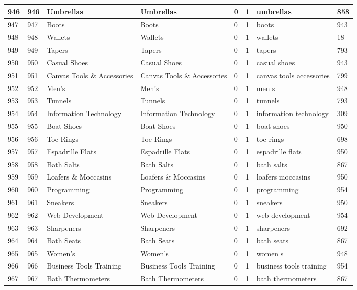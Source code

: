 \begin{longtable}{|l|l|l|l|l|l|l|l|}
946 & 946 & Umbrellas & Umbrellas & 0 & 1 & umbrellas & 858 \\ \hline 
947 & 947 & Boots & Boots & 0 & 1 & boots & 943 \\ \hline 
948 & 948 & Wallets & Wallets & 0 & 1 & wallets & 18 \\ \hline 
949 & 949 & Tapers & Tapers & 0 & 1 & tapers & 793 \\ \hline 
950 & 950 & Casual Shoes & Casual Shoes & 0 & 1 & casual shoes & 943 \\ \hline 
951 & 951 & Canvas Tools \& Accessories & Canvas Tools \& Accessories & 0 & 1 & canvas tools accessories & 799 \\ \hline 
952 & 952 & Men's & Men's & 0 & 1 & men s & 948 \\ \hline 
953 & 953 & Tunnels & Tunnels & 0 & 1 & tunnels & 793 \\ \hline 
954 & 954 & Information Technology & Information Technology & 0 & 1 & information technology & 309 \\ \hline 
955 & 955 & Boat Shoes & Boat Shoes & 0 & 1 & boat shoes & 950 \\ \hline 
956 & 956 & Toe Rings & Toe Rings & 0 & 1 & toe rings & 698 \\ \hline 
957 & 957 & Espadrille Flats & Espadrille Flats & 0 & 1 & espadrille flats & 950 \\ \hline 
958 & 958 & Bath Salts & Bath Salts & 0 & 1 & bath salts & 867 \\ \hline 
959 & 959 & Loafers \& Moccasins & Loafers \& Moccasins & 0 & 1 & loafers moccasins & 950 \\ \hline 
960 & 960 & Programming & Programming & 0 & 1 & programming & 954 \\ \hline 
961 & 961 & Sneakers & Sneakers & 0 & 1 & sneakers & 950 \\ \hline 
962 & 962 & Web Development & Web Development & 0 & 1 & web development & 954 \\ \hline 
963 & 963 & Sharpeners & Sharpeners & 0 & 1 & sharpeners & 692 \\ \hline 
964 & 964 & Bath Seats & Bath Seats & 0 & 1 & bath seats & 867 \\ \hline 
965 & 965 & Women's & Women's & 0 & 1 & women s & 948 \\ \hline 
966 & 966 & Business Tools Training & Business Tools Training & 0 & 1 & business tools training & 954 \\ \hline 
967 & 967 & Bath Thermometers & Bath Thermometers & 0 & 1 & bath thermometers & 867 \\ \hline 

\end{longtable}
